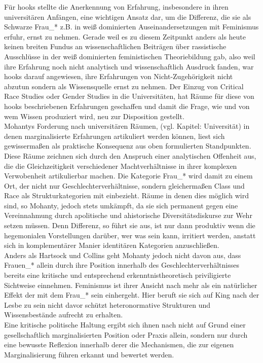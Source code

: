 Für hooks stellte die Anerkennung von Erfahrung, insbesondere in ihren
universitären Anfängen, eine wichtigen Ansatz dar, um die Differenz, die sie
als Schwarze Frau\_* z.B. in weiß dominierten Auseinandersetzungen mit
Feminismus erfuhr, ernst zu nehmen. Gerade weil es zu diesem Zeitpunkt anders
als heute keinen breiten Fundus an wissenschaftlichen Beiträgen über
rassistische Ausschlüsse in der weiß dominierten feministischen Theoriebildung
gab, also weil ihre Erfahrung noch nicht analytisch und wissenschaftlich
Ausdruck fanden, war hooks darauf angewiesen, ihre Erfahrungen von
Nicht-Zugehörigkeit nicht abzutun sondern als Wissensquelle ernst zu
nehmen.\footnotemark {}
Der Einzug von Critical Race Studies oder Gender Studies in die Universitäten,
hat Räume für diese von hooks beschriebenen Erfahrungen geschaffen und damit
die Frage, wie und von wem Wissen produziert wird, neu zur Disposition
gestellt.\footnotemark {} \\

Mohantys Forderung nach universitären Räumen, (vgl. Kapitel: Universität)
in denen marginalisierte Erfahrungen artikuliert werden können, liest sich
gewissermaßen als praktische Konsequenz aus oben formulierten Standpunkten.
Diese Räume zeichnen sich durch den Anspruch einer analytischen Offenheit aus,
die die Gleichzeitigkeit verschiedener Machtverhältnisse in ihrer komplexen
Verwobenheit artikulierbar machen. Die Kategorie Frau\_* wird damit zu einem
Ort, der nicht nur Geschlechterverhältnisse, sondern gleichermaßen Class und
Race als Strukturkategorien mit einbezieht. Räume in denen dies möglich wird
sind, so Mohanty, jedoch stets umkämpft, da sie sich permanent gegen eine
Vereinnahmung durch apolitische und ahistorische Diversitätsdiskurse zur Wehr
setzen müssen. Denn Differenz, so führt sie aus, ist nur dann produktiv wenn
die hegemonialen Vorstellungen darüber, wer was sein kann, irritiert werden,
anstatt sich in komplementärer Manier identitären Kategorien
anzuschließen.\footnotemark {}\\ 

Anders als Hartsock und Collins geht Mohanty jedoch nicht davon aus, dass
Frauen\_* allein durch ihre Position innerhalb des Geschlechterverhältnisses
bereits eine kritische und entsprechend erkenntnistheoretisch priviligierte
Sichtweise einnehmen. Feminismus ist ihrer Ansicht nach mehr als ein
natürlicher Effekt der mit dem Frau\_* sein einhergeht. Hier beruft sie sich auf
King nach der Lesbe zu sein nicht davor schützt heteronormative Strukturen und
Wissensbestände aufrecht zu erhalten. \\
Eine kritische politische Haltung ergibt
sich ihnen nach nicht auf Grund einer gesellschaftlich marginalisierten
Position oder Praxis allein, sondern nur durch eine bewusste Reflexion
innerhalb derer die Mechanismen, die zur eigenen Marginalisierung führen
erkannt und bewertet werden.\footnotemark {}\\

